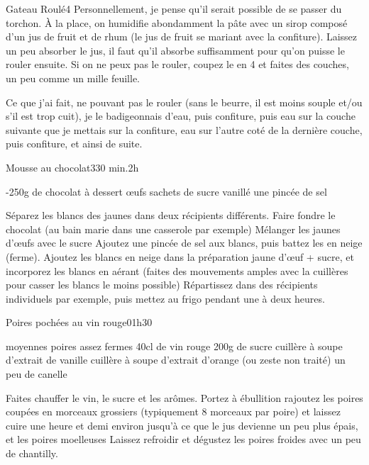 \begin{recette}{Gateau Roulé}{4}{}{}
Personnellement, je pense qu'il serait possible de se passer du torchon. À la place, on humidifie abondamment la pâte avec un sirop composé d'un jus de fruit et de rhum (le jus de fruit se mariant avec la confiture). Laissez un peu absorber le jus, il faut qu'il absorbe suffisamment pour qu'on puisse le rouler ensuite. Si on ne peux pas le rouler, coupez le en 4 et faites des couches, un peu comme un mille feuille.

Ce que j'ai fait, ne pouvant pas le rouler (sans le beurre, il est moins souple et/ou s'il est trop cuit), je le badigeonnais d'eau, puis confiture, puis eau sur la couche suivante que je mettais sur la confiture, eau sur l'autre coté de la dernière couche, puis confiture, et ainsi de suite.

\end{recette}

\begin{recette}{Mousse au chocolat}{3}{30 min.}{2h}
\begin{ingredients}
-250g de chocolat à dessert
 œufs
 sachets de sucre vanillé
\ingredient une pincée de sel
\end{ingredients}

\begin{preparation}
\etape Séparez les blancs des jaunes dans deux récipients différents.
\etape Faire fondre le chocolat (au bain marie dans une casserole par exemple)
\etape Mélanger les jaunes d'œufs avec le sucre
\etape Ajoutez une pincée de sel aux blancs, puis battez les en neige (ferme).
\etape Ajoutez les blancs en neige dans la préparation jaune d'œuf + sucre, et incorporez les blancs en aérant (faites des mouvements amples avec la cuillères pour casser les blancs le moins possible)
\etape Répartissez dans des récipients individuels par exemple, puis mettez au frigo pendant une à deux heures.
\end{preparation}
\end{recette}


\begin{recette}{Poires pochées au vin rouge}{0}{1h30}{}
\begin{ingredients}
 moyennes poires assez fermes
\ingredient 40cl de vin rouge
\ingredient 200g de sucre
 cuillère à soupe d'extrait de vanille
 cuillère à soupe d'extrait d'orange (ou zeste non traité)
\ingredient un peu de canelle
\end{ingredients}

\begin{preparation}
\etape Faites chauffer le vin, le sucre et les arômes. Portez à ébullition
\etape rajoutez les poires coupées en morceaux grossiers (typiquement 8 morceaux par poire) et laissez cuire une heure et demi environ jusqu'à ce que le jus devienne un peu plus épais, et les poires moelleuses
\etape Laissez refroidir et dégustez les poires froides avec un peu de chantilly.
\end{preparation}

\end{recette}

